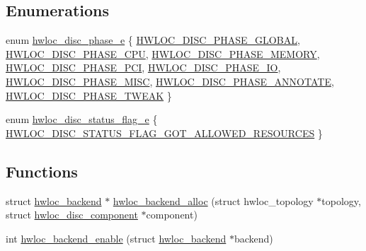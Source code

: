 \subsection*{Enumerations}
\begin{DoxyCompactItemize}
\item 
enum \hyperlink{a00228_ga8c314121c2fc478161bcce758688b9a1}{hwloc\+\_\+disc\+\_\+phase\+\_\+e} \{ \newline
\hyperlink{a00228_gga8c314121c2fc478161bcce758688b9a1ab41c626c79e9ccb1e7d41e7076972283}{H\+W\+L\+O\+C\+\_\+\+D\+I\+S\+C\+\_\+\+P\+H\+A\+S\+E\+\_\+\+G\+L\+O\+B\+AL}, 
\hyperlink{a00228_gga8c314121c2fc478161bcce758688b9a1a6360474df197027761a69bd5fc620250}{H\+W\+L\+O\+C\+\_\+\+D\+I\+S\+C\+\_\+\+P\+H\+A\+S\+E\+\_\+\+C\+PU}, 
\hyperlink{a00228_gga8c314121c2fc478161bcce758688b9a1ac4264a243844c5fbbff495cdb1b4d51d}{H\+W\+L\+O\+C\+\_\+\+D\+I\+S\+C\+\_\+\+P\+H\+A\+S\+E\+\_\+\+M\+E\+M\+O\+RY}, 
\hyperlink{a00228_gga8c314121c2fc478161bcce758688b9a1a677c52064dd987af4988346319b3675a}{H\+W\+L\+O\+C\+\_\+\+D\+I\+S\+C\+\_\+\+P\+H\+A\+S\+E\+\_\+\+P\+CI}, 
\newline
\hyperlink{a00228_gga8c314121c2fc478161bcce758688b9a1aa8e10626cba9af72f5605a1acbdc0015}{H\+W\+L\+O\+C\+\_\+\+D\+I\+S\+C\+\_\+\+P\+H\+A\+S\+E\+\_\+\+IO}, 
\hyperlink{a00228_gga8c314121c2fc478161bcce758688b9a1a8a7cde9bff0ab0d085b102a3e934939b}{H\+W\+L\+O\+C\+\_\+\+D\+I\+S\+C\+\_\+\+P\+H\+A\+S\+E\+\_\+\+M\+I\+SC}, 
\hyperlink{a00228_gga8c314121c2fc478161bcce758688b9a1a68ca5c7ad75a6d9e5355689411621773}{H\+W\+L\+O\+C\+\_\+\+D\+I\+S\+C\+\_\+\+P\+H\+A\+S\+E\+\_\+\+A\+N\+N\+O\+T\+A\+TE}, 
\hyperlink{a00228_gga8c314121c2fc478161bcce758688b9a1ada3ed3f00e74909353d6ea4a96cde5ad}{H\+W\+L\+O\+C\+\_\+\+D\+I\+S\+C\+\_\+\+P\+H\+A\+S\+E\+\_\+\+T\+W\+E\+AK}
 \}
\item 
enum \hyperlink{a00228_gaae1b38cf9b12e489884ce2a07275964b}{hwloc\+\_\+disc\+\_\+status\+\_\+flag\+\_\+e} \{ \hyperlink{a00228_ggaae1b38cf9b12e489884ce2a07275964ba205d644d54a0840bd9165fce7d19e6b1}{H\+W\+L\+O\+C\+\_\+\+D\+I\+S\+C\+\_\+\+S\+T\+A\+T\+U\+S\+\_\+\+F\+L\+A\+G\+\_\+\+G\+O\+T\+\_\+\+A\+L\+L\+O\+W\+E\+D\+\_\+\+R\+E\+S\+O\+U\+R\+C\+ES}
 \}
\end{DoxyCompactItemize}
\subsection*{Functions}
\begin{DoxyCompactItemize}
\item 
struct \hyperlink{a00374}{hwloc\+\_\+backend} $\ast$ \hyperlink{a00228_gadb068565ab6043cbe4d16bfcce067a61}{hwloc\+\_\+backend\+\_\+alloc} (struct hwloc\+\_\+topology $\ast$topology, struct \hyperlink{a00366}{hwloc\+\_\+disc\+\_\+component} $\ast$component)
\item 
int \hyperlink{a00228_ga4715779d7191833e9b1a7490989a7497}{hwloc\+\_\+backend\+\_\+enable} (struct \hyperlink{a00374}{hwloc\+\_\+backend} $\ast$backend)
\end{DoxyCompactItemize}



